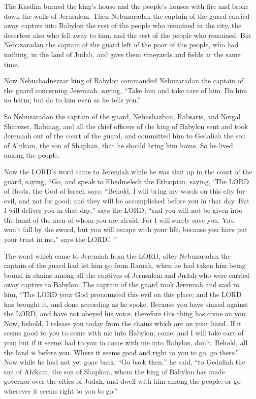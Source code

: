 \myverse{}The Kasdim burned the king’s house and the people’s houses with
fire and broke down the walls of Jerusalem. \myverse{}Then Nebuzaradan the captain of the guard carried away captive into Babylon the rest of the people who remained in the city, the deserters also who fell away to him, and the rest of the people who remained. \myverse{}But Nebuzaradan the captain of the guard left of the poor of the people, who had nothing, in the land of Judah, and gave them vineyards and fields at the same time.


\myverse{}Now Nebuchadnezzar king of Babylon commanded Nebuzaradan the captain of the guard concerning Jeremiah, saying, \myverse{}“Take him and take care of him. Do him no harm; but do to him even as he tells you.”


\myverse{}So Nebuzaradan the captain of the guard, Nebushazban, Rabsaris, and Nergal Sharezer, Rabmag, and all the chief officers of the king of Babylon \myverse{}sent and took Jeremiah out of the court of the guard, and committed him to Gedaliah the son of Ahikam, the son of Shaphan, that he should bring him home. So he lived among the people.


\myverse{}Now the LORD’s word came to Jeremiah while he was shut up in the court of the guard, saying, \myverse{}“Go, and speak to Ebedmelech the Ethiopian, saying, ‘The LORD of Hosts, the God of Israel, says: “Behold, I will bring my words on this city for evil, and not for good; and they will be accomplished before you in that day. \myverse{}But I will deliver you in that day,” says the LORD; “and you will not be given into the hand of the men of whom you are afraid. \myverse{}For I will surely save you. You won’t fall by the sword, but you will escape with your life, because you have put your trust in me,” says the LORD.’ ”


\mychapter{} \myverse*{}The word which came to Jeremiah from the LORD, after Nebuzaradan the captain of the guard had let him go from Ramah, when he had taken him being bound in chains among all the captives of Jerusalem and Judah who were carried away captive to Babylon. \myverse{}The captain of the guard took Jeremiah and said to him, “The LORD your God pronounced this evil on this place; \myverse{}and the LORD has brought it, and done according as he spoke. Because you have sinned against the LORD, and have not obeyed his voice, therefore this thing has come on you. \myverse{}Now, behold, I release you today from the chains which are on your hand. If it seems good to you to come with me into Babylon, come, and I will take care of you; but if it seems bad to you to come with me into Babylon, don’t. Behold, all the land is before you. Where it seems good and right to you to go, go there.” \myverse{}Now while he had not yet gone back, “Go back then,” he said, “to Gedaliah the son of Ahikam, the son of Shaphan, whom the king of Babylon has made governor over the cities of Judah, and dwell with him among the people; or go wherever it seems right to you to go.”

